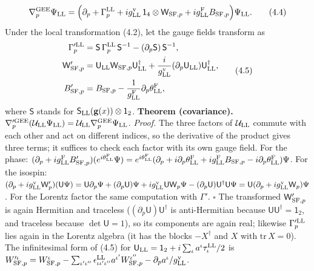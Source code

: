 \documentclass[
  10pt,
]{article}
\begin{document}
\[\nabla^{\rm GEE}_p\Psi_{\rm LL}=\Big(\partial_p+\Gamma^{\rm LL}_p+ig^{\rm v}_{\rm LL}\,\mathsf 1_4\otimes\mathsf W_{{\rm SF},p}+ig^{\rm F}_{\rm LL}B_{{\rm SF},p}\Big)\Psi_{\rm LL}.\tag{4.4}\]
Under the local transformation (4.2), let the gauge fields transform as
\[\begin{aligned}\Gamma'^{\rm LL}_p&=\mathsf S\,\Gamma^{\rm LL}_p\,\mathsf S^{-1}-(\partial_p\mathsf S)\,\mathsf S^{-1},\\\mathsf W'_{{\rm SF},p}&=\mathsf U_{\rm LL}\mathsf W_{{\rm SF},p}\mathsf U_{\rm LL}^\dagger+\frac i{g^{\rm v}_{\rm LL}}(\partial_p\mathsf U_{\rm LL})\mathsf U_{\rm LL}^\dagger,\\B'_{{\rm SF},p}&=B_{{\rm SF},p}-\frac1{g^{\rm F}_{\rm LL}}\partial_p\theta^{\rm F}_{\rm LL},\end{aligned}\tag{4.5}\]
where \(\mathsf S\) stands for
\(\mathsf S_{\rm LL}(\mathbf g(x))\otimes\mathsf 1_2\). \textbf{Theorem
(covariance).}
\(\nabla'^{\rm GEE}_p(\mathcal U_{\rm LL}\Psi_{\rm LL})=\mathcal U_{\rm LL}\nabla^{\rm GEE}_p\Psi_{\rm LL}\).
\emph{Proof.} The three factors of \(\mathcal U_{\rm LL}\) commute with
each other and act on different indices, so the derivative of the
product gives three terms; it suffices to check each factor with its own
gauge field. For the phase:
\((\partial_p+ig^{\rm F}_{\rm LL}B'_{{\rm SF},p})(e^{i\theta^{\rm F}_{\rm LL}}\Psi)=e^{i\theta^{\rm F}_{\rm LL}}(\partial_p+i\partial_p\theta^{\rm F}_{\rm LL}+ig^{\rm F}_{\rm LL}B_{{\rm SF},p}-i\partial_p\theta^{\rm F}_{\rm LL})\Psi\).
For the isospin:
\((\partial_p+ig^{\rm v}_{\rm LL}\mathsf W'_p)(\mathsf U\Psi)=\mathsf U\partial_p\Psi+(\partial_p\mathsf U)\Psi+ig^{\rm v}_{\rm LL}\mathsf U\mathsf W_p\Psi-(\partial_p\mathsf U)\mathsf U^\dagger\mathsf U\Psi=\mathsf U(\partial_p+ig^{\rm v}_{\rm LL}\mathsf W_p)\Psi\).
For the Lorentz factor the same computation with \(\Gamma'\).
\(\square\) The transformed \(\mathsf W'_{{\rm SF},p}\) is again
Hermitian and traceless (\((\partial_p\mathsf U)\mathsf U^\dagger\) is
anti-Hermitian because \(\mathsf U\mathsf U^\dagger=\mathsf 1_2\), and
traceless because \(\det\mathsf U=1\)), so its components are again
real; likewise \(\Gamma'^{\rm LL}_p\) lies again in the Lorentz algebra
(it has the blocks \(-X^\dagger\) and \(X\) with \(\mathrm{tr}\,X=0\)).
The infinitesimal form of (4.5) for
\(\mathsf U_{\rm LL}=\mathsf 1_2+i\sum_\iota a^\iota\tau^{\rm LL}_\iota/2\)
is
\(W'^\iota_{{\rm SF},p}=W^\iota_{{\rm SF},p}-\sum_{\iota'\iota''}\epsilon^{\rm LL}_{\iota\iota'\iota''}a^{\iota'}W^{\iota''}_{{\rm SF},p}-\partial_pa^\iota/g^{\rm v}_{\rm LL}\).
\end{document}

